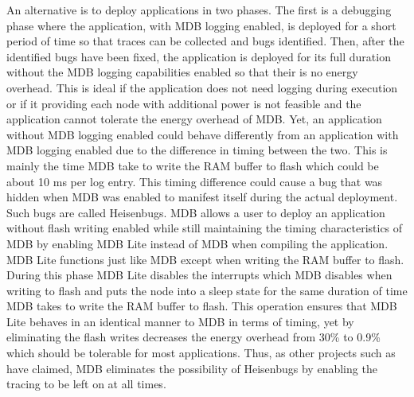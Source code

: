 An alternative is to deploy applications in two phases. The first is a debugging
phase where the application, with MDB logging enabled, is deployed for a short
period of time so that traces can be collected and bugs identified. Then, after
the identified bugs have been fixed, the application is deployed for its full
duration without the MDB logging capabilities enabled so that their is no energy
overhead. This is ideal if the application does not need logging during
execution or if it providing each node with additional power is not feasible and
the application cannot tolerate the energy overhead of MDB. Yet, an application
without MDB logging enabled could behave differently from an application with
MDB logging enabled due to the difference in timing between the two. This is
mainly the time MDB take to write the RAM buffer to flash which could be about
10 ms per log entry. This timing difference could cause a bug that was hidden
when MDB was enabled to manifest itself during the actual deployment. Such bugs
are called Heisenbugs. MDB allows a user to deploy an application without flash
writing enabled while still maintaining the timing characteristics of MDB by
enabling MDB Lite instead of MDB when compiling the application. MDB Lite
functions just like MDB except when writing the RAM buffer to flash. During this
phase MDB Lite disables the interrupts which MDB disables when writing to flash
and puts the node into a sleep state for the same duration of time MDB takes to
write the RAM buffer to flash. This operation ensures that MDB Lite behaves in
an identical manner to MDB in terms of timing, yet by eliminating the flash
writes decreases the energy overhead from 30\% to 0.9\% which should be
tolerable for most applications. Thus, as other projects such
as~\cite{Ronsse2001} have claimed, MDB eliminates the possibility of Heisenbugs
by enabling the tracing to be left on at all times.




